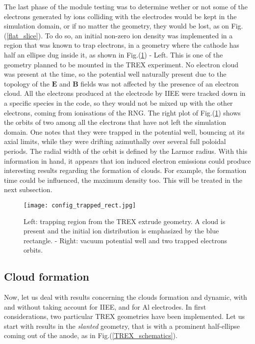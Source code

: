 The last phase of the module testing was to determine wether or not some of the electrons generated by ions colliding with the electrodes would be kept in the simulation domain, or if no matter the geometry, they would be lost, as on Fig.(\ref{flat_slice}). To do so, an initial non-zero ion density was implemented in a region that was known to trap electrons, in a geometry where the cathode has half an ellipse dug inside it, as shown in Fig.(\ref{config_trapped}) - Left. This is one of the geometry planned to be mounted in the TREX experiment. No electron cloud was present at the time, so the potential well naturally present due to the topology of the $\mathbf{E}$ and $\mathbf{B}$ fields was not affected by the presence of an electron cloud. All the electrons produced at the electrode by IIEE were tracked down in a specific species in the code, so they would not be mixed up with the other electrons, coming from ionisations of the RNG. The right plot of Fig.(\ref{config_trapped}) shows the orbits of two among all the electrons that have not left the simulation domain. One notes that they were trapped in the potential well, bouncing at its axial limits, while they were drifting azimuthally over several full poloidal periods. The radial width of the orbit is defined by the Larmor radius. With this information in hand, it appears that ion induced electron emissions could produce interesting results regarding the formation of clouds. For example, the formation time could be influenced, the maximum density too. This will be treated in the next subsection.\\

\begin{figure}[h!]
\centering
	\texttt{[image: config\_trapped\_rect.jpg]}
	\caption{\label{config_trapped} Left: trapping region from the TREX extrude geometry. A cloud is present and the initial ion distribution is emphasized by the blue rectangle. - Right: vacuum potential well and two trapped electrons orbits.}
\end{figure}  

\subsection{Cloud formation}\label{Cloud_section}

Now, let us deal with results concerning the clouds formation and dynamic, with and without taking account for IIEE, and for Al electrodes. In first considerations, two particular TREX geometries have been implemented. Let us start with results in the \emph{slanted} geometry, that is with a prominent half-ellipse coming out of the anode, as in Fig.({\ref{TREX_schematics}}).\\

